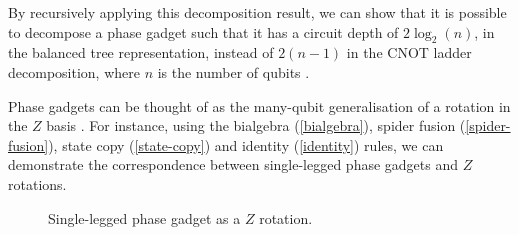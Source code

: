 By recursively applying this decomposition result, we can show that it is possible to decompose a phase gadget such that it has a circuit depth of $2\log_2(n)$, in the balanced tree representation, instead of $2(n-1)$ in the CNOT ladder decomposition, where $n$ is the number of qubits \cite{Cowtan2019}.


Phase gadgets can be thought of as the many-qubit generalisation of a rotation in the $Z$ basis \cite{Yeung2020}. For instance, using the bialgebra (\ref{bialgebra}), spider fusion (\ref{spider-fusion}), state copy (\ref{state-copy}) and identity (\ref{identity}) rules, we can demonstrate the correspondence between single-legged phase gadgets and $Z$ rotations.

\begin{figure}[H]
    \centering
    \caption{Single-legged phase gadget as a $Z$ rotation.}
    \label{phase-gadget-single-leg}
\end{figure}

